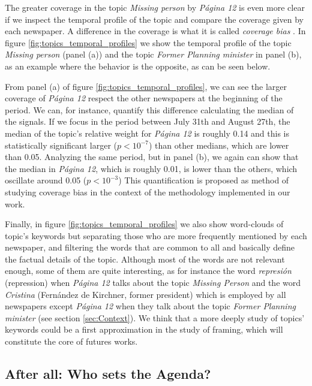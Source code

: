 \documentclass{bmcart}
\begin{document}
\par The greater coverage in the topic \emph{Missing person} by \emph{P\'agina 12} is even more clear if we inspect the temporal profile of the topic and compare the coverage given by each newspaper. A difference in the coverage is what it is called \emph{coverage bias} \cite{dallmann2015media}.  In figure \ref{fig:topics_temporal_profiles} we show the temporal profile of the topic \emph{Missing person} (panel (a)) and the topic \emph{Former Planning minister} in panel (b), as an example where the behavior is the opposite, as can be seen below.

\par From panel (a) of figure \ref{fig:topics_temporal_profiles}, we can see the larger coverage of \emph{P\'agina 12} respect the other newspapers at the beginning of the period. We can, for instance, quantify this difference calculating  the median of the signals. If we focus in the period between July 31th and August 27th, the median of the topic's relative weight for \emph{P\'agina 12} is roughly 0.14 and this is statistically significant larger ($p < 10^{-7}$) than other medians, which are lower than 0.05.
Analyzing the same period, but in panel (b), we again can show that the median in \emph{P\'agina 12}, which is roughly 0.01, is lower than the others, which oscillate around 0.05 ($p<10^{-3}$)
This quantification is proposed as method of studying coverage bias in the context of the methodology implemented in our work. 

\par Finally, in figure \ref{fig:topics_temporal_profiles} we also show word-clouds of topic's keywords but separating those who are more frequently mentioned by each newspaper, and filtering the words that are common to all and basically define the factual details of the topic.
Although most of the words are not relevant enough, some of them are quite interesting, as for instance the word \emph{represi\'on} (repression) when \emph{P\'agina 12} talks about the topic \emph{Missing Person} and the word \emph{Cristina} (Fern\'andez de Kirchner, former president) which is employed by all newspapers except \emph{P\'agina 12} when they  talk about the topic \emph{Former Planning minister} (see section \ref{sec:Context}).
We think that a more deeply study of topics' keywords could be a first approximation in the study of framing, which will constitute the core of futures works.

\subsection*{After all: Who sets the Agenda?}
\label{sec:who_sets}
\end{document}

